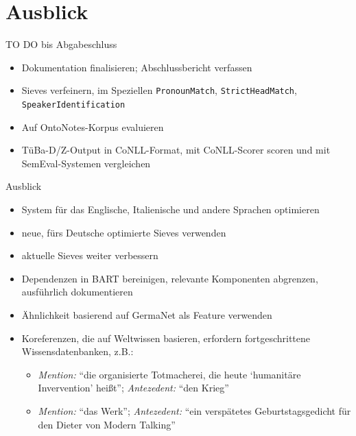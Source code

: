 \documentclass[11pt,a4paper]{beamer}
\begin{document}
\section{Ausblick}
\begin{frame}{TO DO bis Abgabeschluss}
\begin{itemize}
\item Dokumentation finalisieren; Abschlussbericht verfassen
\item Sieves verfeinern, im Speziellen \texttt{PronounMatch}, \texttt{StrictHeadMatch}, \texttt{SpeakerIdentification}
\item Auf OntoNotes-Korpus evaluieren
\item TüBa-D/Z-Output in CoNLL-Format, mit CoNLL-Scorer scoren und mit SemEval-Systemen vergleichen
\end{itemize}
\end{frame}

\begin{frame}{Ausblick}
\begin{itemize}
\item System für das Englische, Italienische und andere Sprachen optimieren
\item neue, fürs Deutsche optimierte Sieves verwenden
\item aktuelle Sieves weiter verbessern
\item Dependenzen in BART bereinigen, relevante Komponenten abgrenzen, ausführlich dokumentieren
\item Ähnlichkeit basierend auf GermaNet als Feature verwenden
\item Koreferenzen, die auf Weltwissen basieren, erfordern fortgeschrittene Wissensdatenbanken, z.B.:\\
  \begin{itemize}
  \item \textit{Mention:} “die organisierte Totmacherei, die heute ‘humanitäre Invervention’ heißt”; \textit{Antezedent:} “den Krieg”\\
  \item \textit{Mention:} “das Werk”; \textit{Antezedent:} “ein verspätetes Geburtstagsgedicht für den Dieter von Modern Talking”\\
  \end{itemize}
\end{itemize}
\end{frame}


%
%
\end{document}
